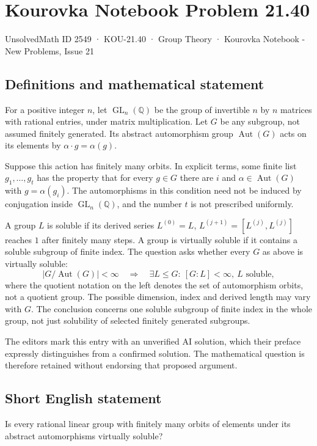 \documentclass[11pt,a4paper]{article}
\begin{document}
\section*{Kourovka Notebook Problem 21.40}\label{2549}
{\small UnsolvedMath ID 2549 · KOU-21.40 · Group Theory · Kourovka Notebook - New Problems, Issue 21}
\subsection{Definitions and mathematical statement}
For a positive integer $n$, let $\operatorname{GL}_n(\mathbb Q)$ be the
group of invertible $n$ by $n$ matrices with rational entries, under
matrix multiplication. Let $G$ be any subgroup, not assumed finitely
generated. Its abstract automorphism group $\operatorname{Aut}(G)$ acts
on its elements by $\alpha\cdot g=\alpha(g)$.

Suppose this action has finitely many orbits. In explicit terms, some
finite list $g_1,\ldots,g_t$ has the property that for every $g\in G$
there are $i$ and $\alpha\in\operatorname{Aut}(G)$ with $g=\alpha(g_i)$.
The automorphisms in this condition need not be induced by conjugation
inside $\operatorname{GL}_n(\mathbb Q)$, and the number $t$ is not
prescribed uniformly.

A group $L$ is soluble if its derived series $L^{(0)}=L$,
$L^{(j+1)}=[L^{(j)},L^{(j)}]$ reaches $1$ after finitely many steps.
A group is virtually soluble if it contains a soluble subgroup of
finite index. The question asks whether every $G$ as above is virtually
soluble:
\[
 |G/\operatorname{Aut}(G)|<\infty
 \quad\Longrightarrow\quad
 \exists L\le G:\ [G:L]<\infty,\ L\text{ soluble},
\]
where the quotient notation on the left denotes the set of automorphism
orbits, not a quotient group. The possible dimension, index and derived
length may vary with $G$. The conclusion concerns one soluble subgroup
of finite index in the whole group, not just solubility of selected
finitely generated subgroups.

The editors mark this entry with an unverified AI solution, which their
preface expressly distinguishes from a confirmed solution. The mathematical
question is therefore retained without endorsing that proposed argument.
\subsection{Short English statement}
Is every rational linear group with finitely many orbits of elements under its abstract automorphisms virtually soluble?
\end{document}

